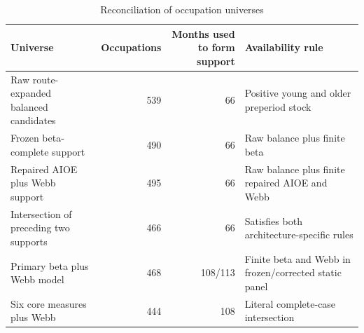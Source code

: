 \begin{table}[!htbp]
\centering
\caption{Reconciliation of occupation universes}\label{tab:sampleflow}
\begin{threeparttable}
\small
\begin{tabularx}{\textwidth}{@{}YrrY@{}}
\toprule
Universe & Occupations & Months used to form support & Availability rule \\
\midrule
Raw route-expanded balanced candidates & 539 & 66 & Positive young and older preperiod stock \\
Frozen beta-complete support & 490 & 66 & Raw balance plus finite beta \\
Repaired AIOE plus Webb support & 495 & 66 & Raw balance plus finite repaired AIOE and Webb \\
Intersection of preceding two supports & 466 & 66 & Satisfies both architecture-specific rules \\
Primary beta plus Webb model & 468 & 108/113 & Finite beta and Webb in frozen/corrected static panel \\
Six core measures plus Webb & 444 & 108 & Literal complete-case intersection \\
\bottomrule
\end{tabularx}
\end{threeparttable}
\end{table}
